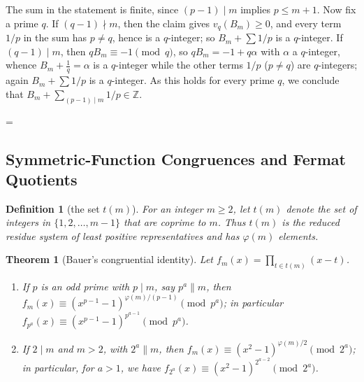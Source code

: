 \documentclass[11pt]{article}
\makeatletter
\theoremstyle{ntstyle}
\newtheorem{theorem}{Theorem}[subsection]
\newtheorem{definition}{Definition}[subsection]
\let\nt@closedisplay\]
\def\nt@guardedclose{\@ifnextchar\par{\nt@closeafterpar}{\@ifnextchar\end{\postdisplaypenalty\@M\nt@closedisplay}{\nt@closedisplay}}}
\def\nt@closeafterpar\par{\@ifnextchar\par{\nt@closeafterpar}{\@ifnextchar\end{\postdisplaypenalty\@M\nt@closedisplay\par}{\nt@closedisplay\par}}}
\renewenvironment{proof}[1][\proofname]{\par
  \pushQED{\qed}\normalfont\topsep\medskipamount\edef\nt@afterproof{\@endparpenalty=\the\@endparpenalty\relax}\@beginparpenalty\@M\@endparpenalty\@M\let\]\nt@guardedclose\trivlist\item[]\textit{#1\@addpunct{.}} \ignorespaces}{\ifvmode\addpenalty\@M\fi\popQED\nt@afterproof\endtrivlist\@endpefalse}
\makeatother
\begin{document}
\begin{proof}
	The sum in the statement is finite, since $(p-1)\mid m$ implies $p\le m+1$. Now fix a prime $q$. If $(q-1) \nmid m$, then the claim gives $v_q(B_m) \ge 0$, and every term $1/p$ in the sum has $p \neq q$, hence is a $q$-integer; so $B_m + \sum 1/p$ is a $q$-integer. If $(q-1) \mid m$, then $q B_m \equiv -1 \pmod{q}$, so $q B_m = -1 + q\alpha$ with $\alpha$ a $q$-integer, whence $B_m + \tfrac{1}{q} = \alpha$ is a $q$-integer while the other terms $1/p$ ($p \neq q$) are $q$-integers; again $B_m + \sum 1/p$ is a $q$-integer. As this holds for every prime $q$, we conclude that $B_m + \sum_{(p-1) \mid m} 1/p \in \mathbb{Z}$.

\end{proof}
\subsection{Symmetric-Function Congruences and Fermat Quotients}

\begin{definition}[the set $t(m)$]\label{def:6.9.1}
	For an integer $m\ge2$, let $t(m)$ denote the set of integers in
	$\{1,2,\ldots,m-1\}$ that are coprime to $m$. Thus $t(m)$ is the
	reduced residue system of least positive representatives and has
	$\varphi(m)$ elements.

\end{definition}
\begin{theorem}[Bauer's congruential identity]\label{thm:6.9.1} Let
	$f_m(x) = \prod_{t \in t(m)}(x - t)$.

	\begin{enumerate}[label={\alph*)}]
		\item If $p$ is an odd prime with $p\mid m$, say $p^{a} \parallel m$, then $f_m(x)
			      \equiv (x^{p-1} - 1)^{\varphi(m)/(p-1)} \pmod{p^{a}}$; in particular
		      $f_{p^{a}}(x) \equiv (x^{p-1} - 1)^{p^{a-1}} \pmod{p^{a}}$.
		\item If $2 \mid m$ and $m > 2$, with $2^{a} \parallel m$, then $f_m(x)
			      \equiv (x^{2} - 1)^{\varphi(m)/2} \pmod{2^{a}}$; in particular, for
		      $a > 1$, we have $f_{2^{a}}(x) \equiv (x^{2} - 1)^{2^{a-2}} \pmod{2^{a}}$.
	\end{enumerate}

\end{theorem}
\end{document}

